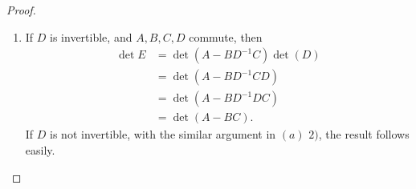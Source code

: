 \documentclass[12pt]{article}
\begin{document}
\begin{proof}
\begin{enumerate}[label=(\alph*)]
    \item If $D$ is invertible, and $A, B, C, D$ commute, then
    \begin{align*}
        \det E & = \det (A-BD^{-1}C) \det(D) \\
        & = \det (A-BD^{-1}CD) \\
        & = \det (A-BD^{-1}DC) \\
        & = \det (A-BC).
    \end{align*}
    If $D$ is not invertible, with the similar argument in $(a)\,\,2)$, the result follows easily.
\end{enumerate}
\end{proof}
\end{document}
